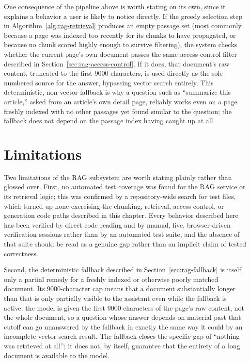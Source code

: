 One consequence of the pipeline above is worth stating on its own, since it explains a behavior a user is likely to notice directly. If the greedy selection step in Algorithm~\ref{alg:rag-retrieval} produces an empty passage set (most commonly because a page was indexed too recently for its chunks to have propagated, or because no chunk scored highly enough to survive filtering), the system checks whether the current page's own document passes the same access-control filter described in Section~\ref{sec:rag-access-control}. If it does, that document's raw content, truncated to the first 9000 characters, is used directly as the sole numbered source for the answer, bypassing vector search entirely. This deterministic, non-vector fallback is why a question such as ``summarize this article,'' asked from an article's own detail page, reliably works even on a page freshly indexed with no other passages yet found similar to the question; the fallback does not depend on the passage index having caught up at all.

\section{Limitations}
\label{sec:rag-limitations}

Two limitations of the RAG subsystem are worth stating plainly rather than glossed over. First, no automated test coverage was found for the RAG service or its retrieval logic; this was confirmed by a repository-wide search for test files, which turned up none exercising the chunking, retrieval, access-control, or generation code paths described in this chapter. Every behavior described here has been verified by direct code reading and by manual, live, browser-driven verification sessions rather than by an automated test suite, and the absence of that suite should be read as a genuine gap rather than an implicit claim of tested correctness.

Second, the deterministic fallback described in Section~\ref{sec:rag-fallback} is itself only a partial remedy for a freshly indexed or otherwise poorly matched document. Its 9000-character cap means that a document substantially longer than that is only partially visible to the assistant even while the fallback is active: the model is given the first 9000 characters of the page's raw content, not the whole document, so a question whose answer depends on material past that cutoff can go unanswered by the fallback in exactly the same way it could by an incomplete vector-search result. The fallback closes the specific gap of ``nothing was retrieved at all''; it does not, by itself, guarantee that the entirety of a long document is available to the model.
